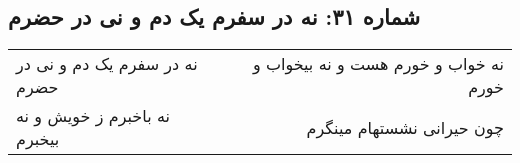 \begin{center}
\section*{شماره ۳۱: نه در سفرم یک دم و نی در حضرم}
\label{sec:031}
\begin{longtable}{l p{0.5cm} r}
نه در سفرم یک دم و نی در حضرم
&&
نه خواب و خورم هست و نه بیخواب و خورم
\\
نه باخبرم ز خویش و نه بیخبرم
&&
چون حیرانی نشستهام مینگرم
\\
\end{longtable}
\end{center}

